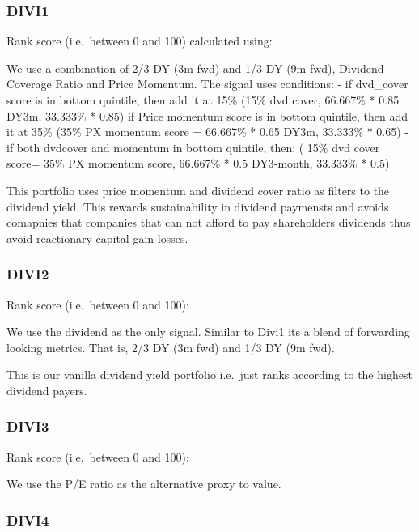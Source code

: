 \documentclass[11pt,preprint, authoryear]{elsarticle}
\numberwithin{equation}{section}
\numberwithin{figure}{section}
\numberwithin{table}{section}
\begin{document}
\hypertarget{divi1}{%
\subsubsection*{DIVI1}\label{divi1}}

Rank score (i.e.~between 0 and 100) calculated using:

We use a combination of 2/3 DY (3m fwd) and 1/3 DY (9m fwd), Dividend
Coverage Ratio and Price Momentum. The signal uses conditions: - if
dvd\_cover score is in bottom quintile, then add it at 15\% (15\% dvd
cover, 66.667\% * 0.85 DY3m, 33.333\% * 0.85) if Price momentum score is
in bottom quintile, then add it at 35\% (35\% PX momentum score =
66.667\% * 0.65 DY3m, 33.333\% * 0.65) - if both dvdcover and momentum
in bottom quintile, then: ( 15\% dvd cover score= 35\% PX momentum
score, 66.667\% * 0.5 DY3-month, 33.333\% * 0.5)

This portfolio uses price momentum and dividend cover ratio as filters
to the dividend yield. This rewards sustainability in dividend paymensts
and avoids comapnies that companies that can not afford to pay
shareholders dividends thus avoid reactionary capital gain losses.

\hypertarget{divi2}{%
\subsubsection*{DIVI2}\label{divi2}}

Rank score (i.e.~between 0 and 100):

We use the dividend as the only signal. Similar to Divi1 its a blend of
forwarding looking metrics. That is, 2/3 DY (3m fwd) and 1/3 DY (9m
fwd).

This is our vanilla dividend yield portfolio i.e.~just ranks according
to the highest dividend payers.

\hypertarget{divi3}{%
\subsubsection*{DIVI3}\label{divi3}}

Rank score (i.e.~between 0 and 100):

We use the P/E ratio as the alternative proxy to value.

\hypertarget{divi4}{%
\subsubsection*{DIVI4}\label{divi4}}
\end{document}
